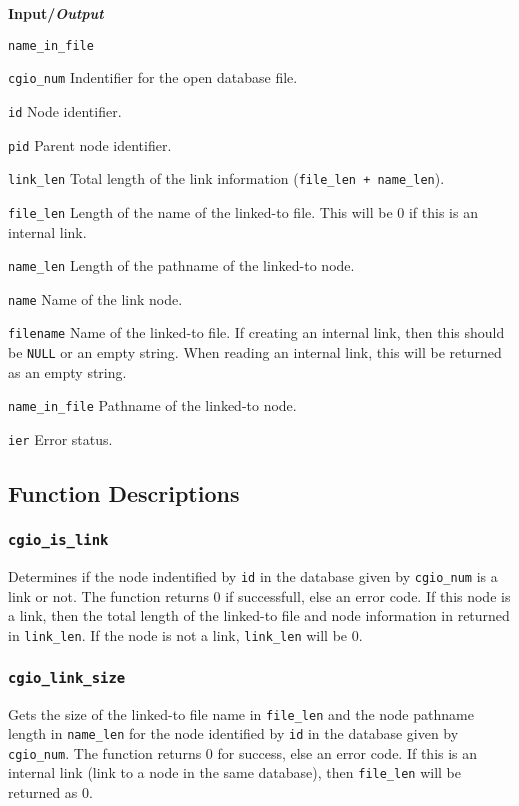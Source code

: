 \noindent
\textbf{\textcolor{input}{Input}/\textcolor{output}{\textit{Output}}}

\begin{Ventryi}{\texttt{name\_in\_file}}\raggedright
\item [\texttt{cgio\_num}]
      Indentifier for the open database file.
\item [\texttt{id}]
      Node identifier.
\item [\texttt{pid}]
      Parent node identifier.
\item [\texttt{link\_len}]
      Total length of the link information (\texttt{file\_len + name\_len}).
\item [\texttt{file\_len}]
      Length of the name of the linked-to file.
      This will be 0 if this is an internal link.
\item [\texttt{name\_len}]
      Length of the pathname of the linked-to node.
\item [\texttt{name}]
      Name of the link node.
\item [\texttt{filename}]
      Name of the linked-to file. If creating an internal link, then this
      should be \texttt{NULL} or an empty string. When reading an internal
      link, this will be returned as an empty string.
\item [\texttt{name\_in\_file}]
      Pathname of the linked-to node.
\item [\texttt{ier}]
      Error status.
\end{Ventryi}

\subsection{Function Descriptions}

\subsubsection{\texttt{cgio\_is\_link}} \label{is_link}
    \noindent
    Determines if the node indentified by \texttt{id} in the database given by
    \texttt{cgio\_num} is a link or not. The function returns 0 if successfull,
    else an error code. If this node is a link, then the total length of the
    linked-to file and node information in returned in \texttt{link\_len}.
    If the node is not a link, \texttt{link\_len} will be 0.

\subsubsection{\texttt{cgio\_link\_size}} \label{link_size}
    \noindent
    Gets the size of the linked-to file name in \texttt{file\_len} and the
    node pathname length in \texttt{name\_len} for the node identified by
    \texttt{id} in the database given by \texttt{cgio\_num}. The function
    returns 0 for success, else an error code. If this is an internal link
    (link to a node in the same database), then \texttt{file\_len} will be
    returned as 0.

